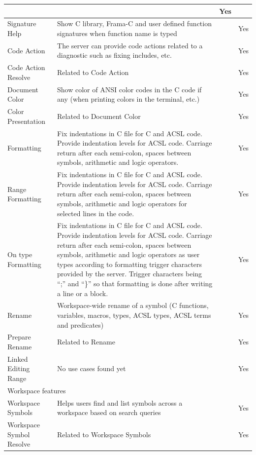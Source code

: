 \documentclass[10pt]{article}
\begin{document}
\begin{singlespace}
\begin{longtable}[H]{|p{3cm}|p{6cm}|p{3cm}|p{2cm}|}
	  & & 
	  Yes \\ \hline
	Signature Help &
	  Show C library, Frama-C and user defined function signatures when function name is typed
	  & & 
	  Yes \\ \hline
	Code Action &
	  The server can provide code actions related to a diagnostic such as fixing includes, etc.
	  & & 
	  Yes \\ \hline
	Code Action Resolve &
	  Related to Code Action
	  & & 
	  Yes \\ \hline
	Document Color &
	  Show color of ANSI color codes in the C code if any (when printing colors in the terminal, etc.)
	  & & 
	  Yes \\ \hline
	Color Presentation &
	  Related to Document Color
	  & & 
	  Yes \\ \hline
	Formatting &
	  Fix indentations in C file for C and ACSL code.  Provide indentation levels for ACSL code. Carriage return after each semi-colon, spaces between symbols, arithmetic and logic operators.
	  & & 
	  Yes \\ \hline
	Range Formatting &
	  Fix indentations in C file for C and ACSL code.  Provide indentation levels for ACSL code. Carriage return after each semi-colon, spaces between symbols, arithmetic and logic operators for selected lines in the code.
	  & & 
	  Yes \\ \hline
	On type Formatting &
	  Fix indentations in C file for C and ACSL code.  Provide indentation levels for ACSL code. Carriage return after each semi-colon, spaces between symbols, arithmetic and logic operators as user types according to formatting trigger characters provided by the server. Trigger characters being ``;'' and ``\}'' so that formatting is done after writing a line or a block. &
	  &
	  Yes \\ \hline
	Rename &
	  Workspace-wide rename of a symbol (C functions, variables, macros, types, ACSL types, ACSL terms and predicates)
	  & & 
	  Yes \\ \hline
	Prepare Rename &
	  Related to Rename
	  & & 
	  Yes \\ \hline
	Linked Editing Range &
	  No use cases found yet
	  & & 
	  Yes \\ \hline
	\multicolumn{4}{|l|}{Workspace features} \\ \hline
	Workspace Symbols &
	  Helps users find and list symbols across a workspace based on search queries
	  & & 
	  Yes \\ \hline
	Workspace Symbol Resolve &
	  Related to Workspace Symbols
	  & & 
	  Yes \\ \hline

\end{longtable}
\end{singlespace}
\end{document}
